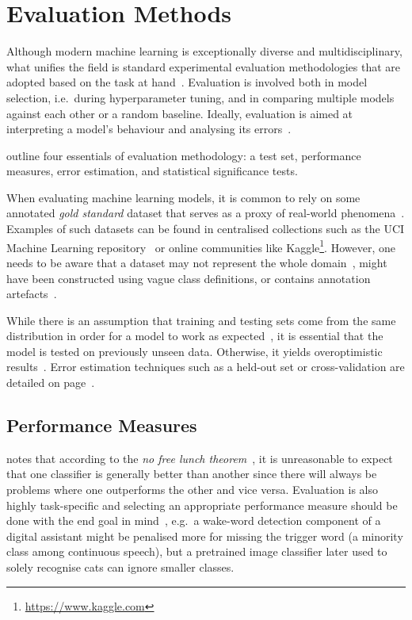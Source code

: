 \chapter{Evaluation Methods}
\label{ch:evaluation-methods}

Although modern machine learning is exceptionally diverse and multidisciplinary, what unifies the field is standard experimental evaluation methodologies that are adopted based on the task at hand~\citep{Kibler1988}.
%
Evaluation is involved both in model selection, i.e.\ during hyperparameter tuning, and in comparing multiple models against each other or a random baseline.
Ideally, evaluation is aimed at interpreting a model's behaviour and analysing its errors~\citep{Doshi2017}.

\citet{Japkowic2011} outline four essentials of evaluation methodology: a test set, performance measures, error estimation, and statistical significance tests.

When evaluating machine learning models, it is common to rely on some annotated \emph{gold standard} dataset that serves as a proxy of real-world phenomena~\citep{Manning2008}.
%
Examples of such datasets can be found in centralised collections such as the UCI Machine Learning repository~\citep{Dua2017} or online communities like Kaggle\footnote{\url{https://www.kaggle.com}}.
However, one needs to be aware that a dataset
may not represent the whole domain~\citep{Japkowic2011},
might have been constructed using vague class definitions,
or contains annotation artefacts~\citep{Hand2006}.

While there is an assumption that training and testing sets come from the same distribution in order for a model to work as expected~\citep{Japkowic2011}, it is essential that the model is tested on previously unseen data.
Otherwise, it yields overoptimistic results~\citep{Kibler1988}.
%
Error estimation techniques such as a held-out set or cross-validation are detailed
on page~\pageref{ch:cross-validation}.

\section{Performance Measures}
\citet{Stapor17} notes that according to the \emph{no free lunch theorem}~\citep{Wolpert1996}, it is unreasonable to expect that one classifier is generally better than another since there will always be problems where one outperforms the other and vice versa.
Evaluation is also highly task-specific and selecting an appropriate performance measure should be done with the end goal in mind~\citep{goodfellow2016deeplearning}, e.g.\ a wake-word detection component of a digital assistant might be penalised more for missing the trigger word (a minority class among continuous speech), but a pretrained image classifier later used to solely recognise cats can ignore smaller classes.

